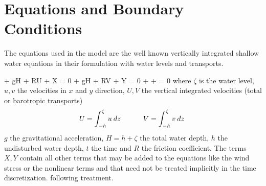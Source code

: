 \newcommand{\olds} {\mbox{$\scriptstyle (0)$}}
\newcommand{\news} {\mbox{$\scriptstyle (1)$}}
\newcommand{\meds} {\mbox{$\scriptscriptstyle (\frac{1}{2})$}}
\newcommand{\half} {\mbox{$\scriptstyle \frac{1}{2}$}}

\newcommand{\nsz} {\normalsize}
\newcommand{\uold} {\mbox{$U^{\olds}$}}
\newcommand{\vold} {\mbox{$V^{\olds}$}}
\newcommand{\unew} {\mbox{$U^{\news}$}}
\newcommand{\vnew} {\mbox{$V^{\news}$}}
\newcommand{\zold} {\zeta^{(0)}}
\newcommand{\znew} {\zeta^{(1)}}
\newcommand{\resr} {{\cal R}}
\newcommand{\drho} {\frac{1}{\rho_{0}}}
\newcommand{\fracs}[2] {\mbox{$\frac{#1}{#2}$}}
\newcommand{\ffxx} {\tilde{f_x}}
\newcommand{\ffyy} {\tilde{f_y}}

\newcommand{\uv} {{\bf U}}
\newcommand{\uvold} {{\bf U^{(0)}}}
\newcommand{\uvnew} {{\bf U^{(1)}}}
\newcommand{\af} {\alpha_{f}}
\newcommand{\ac} {\alpha_{c}}
\newcommand{\am} {\alpha_{m}}
\newcommand{\duv} {\Delta {\bf U}}
\newcommand{\dzeta} {\Delta \zeta}
\newcommand{\iv} {{\bf I}}
\newcommand{\ivh} {\hat{\bf I}}
\newcommand{\fv} {{\bf F}}
\newcommand{\uvh} {\hat{\bf U}}




\section{Equations and Boundary Conditions}

The equations used in the model are the well known vertically integrated
shallow water equations in their formulation with water levels and
transports.

\beq \label{ubar}
 + gH \xdif{\zeta} + RU + X = 0
\eeq
\beq
{} + gH \ydif{\zeta} + RV + Y = 0
\eeq
\beq \label{zcon}
\tdif{\zeta} +  +  = 0
\eeq
where $\zeta$ is the water level, $u,v$ the velocities in $x$ and $y$
direction,
$U,V$ the vertical integrated velocities (total  or barotropic
transports)
\[
 U = \int_{-h}^{\zeta} u \: dz \; \hspace{1.cm}
 V = \int_{-h}^{\zeta} v \: dz \;
\]
$g$ the gravitational acceleration, $H=h+\zeta$ the total water
depth, $h$ the undisturbed water depth,
$t$ the time and $R$ the friction coefficient. The terms $X,Y$ contain
all other terms that may be added to the equations like the wind stress or
the nonlinear terms and that need not be treated implicitly in the
time discretization.
following treatment.

